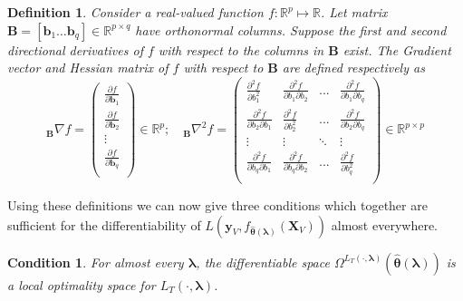 \documentclass[12pt]{article}
\newtheorem{definition}{Definition}
\newtheorem{condition}{Condition}
\begin{document}
\begin{definition}
Consider a real-valued function $f: \mathbb{R}^p \mapsto \mathbb{R}$. Let matrix $\boldsymbol B = [ \boldsymbol b_1 \hdots \boldsymbol b_q ] \in \mathbb{R}^{p \times q}$ have orthonormal columns. Suppose the first and second directional derivatives of $f$ with respect to the columns in $\boldsymbol B$ exist. The Gradient vector and Hessian matrix of $f$ with respect to $\boldsymbol B$ are defined respectively as
\begin{equation}\label{eq:hess}
_{\boldsymbol B} \nabla f  =
\left (
\begin{array}{c}
\frac{\partial f}{\partial \boldsymbol b_1} \\
\frac{\partial f}{\partial \boldsymbol b_2} \\
\vdots\\
\frac{\partial f}{\partial \boldsymbol b_q}\\
\end{array}
\right ) \in \mathbb{R}^p;
\quad
_{\boldsymbol B}\nabla^2 f =
\left (
\begin{array}{cccc}
\frac{\partial^2 f}{\partial b_1^2} & \frac{\partial^2 f}{\partial b_1 \partial b_2} & ...  & \frac{\partial^2 f}{\partial b_1 \partial b_q} \\
\frac{\partial^2 f}{\partial b_2 \partial b_1} & \frac{\partial^2 f}{\partial b_2^2} & ...  & \frac{\partial^2 f}{\partial b_2 \partial b_q} \\
\vdots & \vdots &  \ddots & \vdots \\
\frac{\partial^2 f}{\partial b_q \partial b_1} & \frac{\partial^2 f}{\partial b_q \partial b_2} & ...  & \frac{\partial^2 f}{\partial b_q^2} \\
\end{array}
\right ) \in \mathbb{R}^{p \times p}
\end{equation}
\end{definition}

Using these definitions we can now give three conditions which together are sufficient for the differentiability of $L \left( \boldsymbol{y}_V, f_{\hat{\boldsymbol \theta}(\boldsymbol{\lambda})}(\boldsymbol{X}_V) \right )$ almost everywhere.

\begin{condition}
For almost every $\boldsymbol{\lambda}$, the differentiable space $\Omega^{L_T(\cdot, \boldsymbol{\lambda})}(\hat{\boldsymbol \theta}\left(\boldsymbol{\lambda}\right))$ is a local optimality space for $L_T\left(\cdot,\boldsymbol{\lambda}\right)$.
\label{condn:local_is_diff}
\end{condition}
\end{document}

